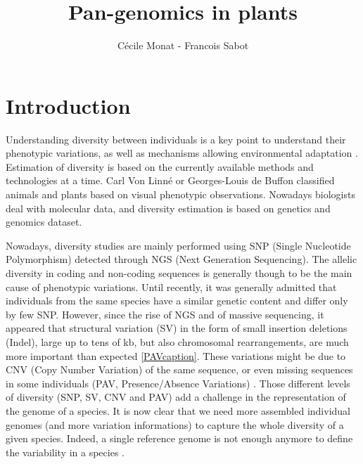 \documentclass[a4paper,10pt,twoside]{report}
\title{Pan-genomics in plants}
\author{Cécile Monat - Francois Sabot}
\begin{document}
\maketitle
%
\section{Introduction}
Understanding diversity between individuals is a key point to understand their phenotypic variations, as well as mechanisms allowing environmental adaptation \cite{Hirsch2014, Guimaraes2015}. Estimation of diversity is based on the currently available methods and technologies at a time. Carl Von Linné or Georges-Louis de Buffon classified animals and plants based on visual phenotypic observations. Nowadays biologists deal with molecular data, and diversity estimation is based on genetics and genomics dataset. 

Nowadays, diversity studies are mainly performed using SNP (Single Nucleotide Polymorphism) \cite{Springer2009, Hirsch2014} detected through NGS (Next Generation Sequencing). The allelic diversity in coding and non-coding sequences is generally though to be the main cause of phenotypic variations. Until recently, it was generally admitted that individuals from the same species have a similar genetic content \cite{Swanson-Wagner2010} and differ only by few SNP. However, since the rise of NGS and of massive sequencing, it appeared that structural variation (SV) in the form of small insertion deletions (Indel), large up to tens of kb, but also chromosomal rearrangements, are much more important than expected \ref{PAVcaption}. These variations might be due to CNV (Copy Number Variation) of the same sequence, or even missing sequences in some individuals (PAV, Presence/Absence Variations) \cite{DaSilva2013,Montenegro2017}. Those different levels of diversity (SNP, SV, CNV and PAV) add a challenge in the representation of the genome of a species. It is now clear that we need more assembled individual genomes (and more variation informations) to capture the whole diversity of a given species. Indeed, a single reference genome is not enough anymore to define the variability in a species \cite{Gan2011,Li2014b,Hirsch2014,Schatz2014}.\\
\end{document}
